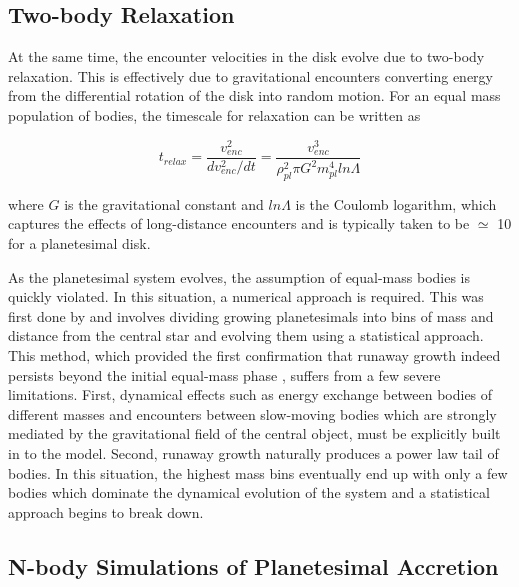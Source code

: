 \subsection{Two-body Relaxation}

At the same time, the encounter velocities in the disk evolve due to two-body relaxation. This is effectively due to gravitational encounters converting energy from the differential rotation of the disk into random motion. For an equal mass population of bodies, the timescale for relaxation can be written as 

\begin{equation}\label{eq:relax}
	t_{relax} = \frac{v_{enc}^2}{d v_{enc}^2 / dt} = \frac{v_{enc}^3}{\rho_{pl}^2 \pi G^{2} m_{pl}^4 ln \Lambda}
\end{equation}

\noindent where $G$ is the gravitational constant and $ln \Lambda$ is the Coulomb logarithm, which captures the effects of long-distance encounters and is typically taken to be $\simeq$ 10 for a planetesimal disk.

As the planetesimal system evolves, the assumption of equal-mass bodies is quickly violated. In this situation, a numerical approach is required. This was first done by \cite{greenberg78} and involves dividing growing planetesimals into bins of mass and distance from the central star and evolving them using a statistical approach. This method, which provided the first confirmation that runaway growth indeed persists beyond the initial equal-mass phase \cite{wetherill89}, suffers from a few severe limitations. First, dynamical effects such as energy exchange between bodies of different masses and encounters between slow-moving bodies which are strongly mediated by the gravitational field of the central object, must be explicitly built in to the model. Second, runaway growth naturally produces a power law tail of bodies. In this situation, the highest mass bins eventually end up with only a few bodies which dominate the dynamical evolution of the system and a statistical approach begins to break down.

\subsection{N-body Simulations of Planetesimal Accretion}

